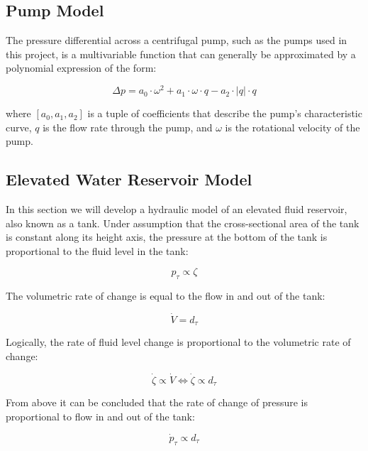 \subsection{Pump Model}\label{subsec:PumpModel}

The pressure differential across a centrifugal pump, such as the pumps used in this project, is a multivariable function that can generally be approximated by a polynomial expression of the form:

\begin{equation}\label{eq:PumpPressure}
	\Delta p =   a_0\cdot \omega^2 +  a_1\cdot \omega \cdot q -a_2\cdot |q|\cdot q
\end{equation}

where $[a_0,a_1,a_2]$ is a tuple of coefficients that describe the pump's characteristic curve, $q$ is the flow rate through the pump, and $\omega$ is the rotational velocity of the pump.

\subsection{Elevated Water Reservoir Model}

In this section we will develop a hydraulic model of an elevated fluid reservoir, also known as a tank.
Under assumption that the cross-sectional area of the tank is constant along its height axis, the pressure at the bottom of the tank is proportional to the fluid level in the tank:

\begin{equation} \label{eq:p prop zeta}
	p_\tau \propto \zeta
\end{equation}

The volumetric rate of change is equal to the flow in and out of the tank:

\begin{equation} \label{eq:vdot = dt}
	\dot{V} = d_\tau
\end{equation}

Logically, the rate of fluid level change is proportional to the volumetric rate of change:  
 
 \begin{equation} \label{eq:zeta prop dt}
	\dot{\zeta} \propto \dot{V} \Leftrightarrow \dot{\zeta} \propto d_\tau
\end{equation} 

From above it can be concluded that the rate of change of pressure is proportional to flow in and out of the tank:

\begin{equation} \label{eq:dotp prop dt}
	\dot{p}_{\tau} \propto d_\tau 
\end{equation}

